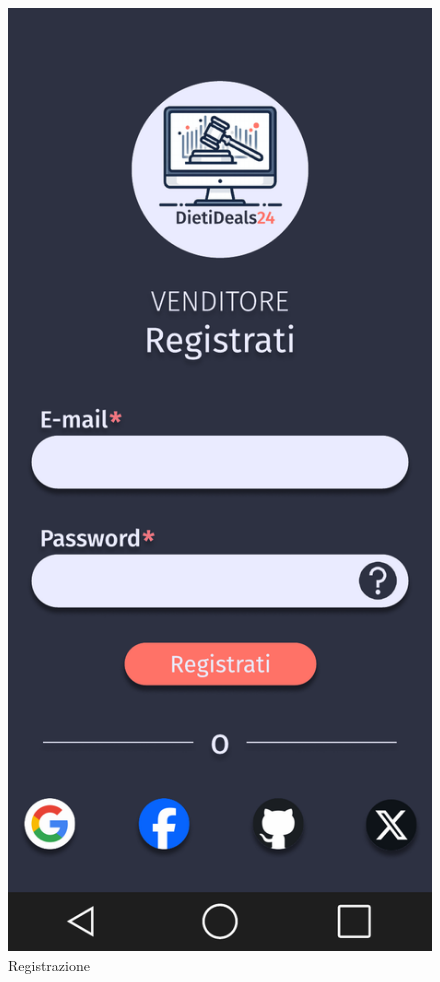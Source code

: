    \begin{figure}[!htb]
        \begin{minipage}{0.32\textwidth}
            \centering
            \includegraphics[width=.7\linewidth]{Immagini/Frames/3.pdf}
            \caption{Registrazione}
        \end{minipage}\hfill
        \begin{minipage}{0.32\textwidth}
            \centering

\end{minipage}
\end{figure}
